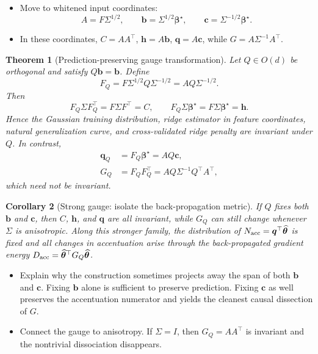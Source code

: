 \documentclass[11pt]{article}
\newtheorem{theorem}{Theorem}
\newtheorem{corollary}[theorem]{Corollary}
\newcommand{\bstar}{\bm\beta^{\star}}
\newcommand{\that}{\widehat{\bm\theta}}
\begin{document}
\begin{itemize}
  \item Move to whitened input coordinates:
  \begin{equation}
    A=F\Sigma^{1/2},\qquad
    \bm b=\Sigma^{1/2}\bstar,
    \qquad
    \bm c=\Sigma^{-1/2}\bstar.
  \end{equation}
  \item In these coordinates, $C=AA^{\top}$, $\bm h=A\bm b$,
        $\bm q=A\bm c$, while
        $G=A\Sigma^{-1}A^{\top}$.
\end{itemize}

\begin{theorem}[Prediction-preserving gauge transformation]
\label{thm:gauge}
Let $Q\in O(d)$ be orthogonal and satisfy $Q\bm b=\bm b$. Define
\begin{equation}
  F_Q=F\Sigma^{1/2}Q\Sigma^{-1/2}
      =AQ\Sigma^{-1/2}.
  \label{eq:gauge-map}
\end{equation}
Then
\begin{equation}
  F_Q\Sigma F_Q^{\top}=F\Sigma F^{\top}=C,
  \qquad
  F_Q\Sigma\bstar=F\Sigma\bstar=\bm h.
\end{equation}
Hence the Gaussian training distribution, ridge estimator in feature
coordinates, natural generalization curve, and cross-validated ridge penalty
are invariant under $Q$. In contrast,
\begin{align}
  \bm q_Q&=F_Q\bstar=AQ\bm c,\\
  G_Q&=F_QF_Q^{\top}=AQ\Sigma^{-1}Q^{\top}A^{\top},
\end{align}
which need not be invariant.
\end{theorem}

\begin{corollary}[Strong gauge: isolate the back-propagation metric]
\label{cor:strong-gauge}
If $Q$ fixes both $\bm b$ and $\bm c$, then $C$, $\bm h$, and $\bm q$ are
all invariant, while $G_Q$ can still change whenever $\Sigma$ is anisotropic.
Along this stronger family, the distribution of
$N_{\rm acc}=\bm q^{\top}\that$ is fixed and all changes in accentuation arise
through the back-propagated gradient energy
$D_{\rm acc}=\that^{\top}G_Q\that$.
\end{corollary}

\begin{itemize}
  \item Explain why the construction sometimes projects away the span of
        both $\bm b$ and $\bm c$. Fixing $\bm b$ alone is sufficient to
        preserve prediction. Fixing $\bm c$ as well preserves the
        accentuation numerator and yields the cleanest causal dissection of
        $G$.
  \item Connect the gauge to anisotropy. If $\Sigma=I$, then
        $G_Q=AA^{\top}$ is invariant and the nontrivial dissociation
        disappears.
\end{itemize}
\end{document}
